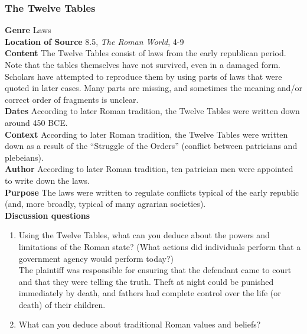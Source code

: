 \documentclass{article}
\begin{document}
\subsubsection*{The Twelve Tables}
\textbf{Genre}
Laws \\
\textbf{Location of Source}
8.5, \textit{The Roman World}, 4-9 \\
\textbf{Content}
The Twelve Tables consist of laws from the early republican period.  Note that the tables
themselves have not survived, even in a damaged form.  Scholars have attempted to
reproduce them by using parts of laws that were quoted in later cases.  Many parts are
missing, and sometimes the meaning and/or correct order of fragments is unclear. \\
\textbf{Dates}
According to later Roman tradition, the Twelve Tables were written down around 450 BCE. \\
\textbf{Context}
According to later Roman tradition, the Twelve Tables were written down as a result of the
“Struggle of the Orders” (conflict between patricians and plebeians). \\
\textbf{Author}
According to later Roman tradition, ten patrician men were appointed to write down the laws. \\
\textbf{Purpose}
The laws were written to regulate conflicts typical of the early republic (and, more broadly,
typical of many agrarian societies). \\
\textbf{Discussion questions}
\begin{enumerate}
  \item Using the Twelve Tables, what can you deduce about the powers and limitations
  of the Roman state?  (What actions did individuals perform that a government agency
  would perform today?) \\
  The plaintiff was responsible for ensuring that the defendant came to court and that they were telling
  the truth. Theft at night could be punished immediately by death, and fathers had complete
  control over the life (or death) of their children.
  \item What can you deduce about traditional Roman values and beliefs?
\end{enumerate}
\end{document}

